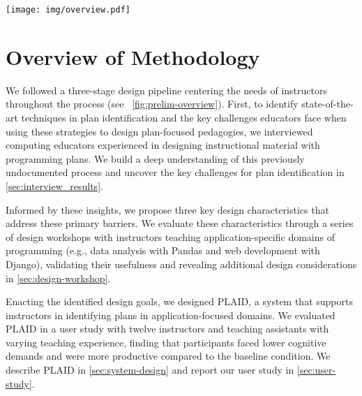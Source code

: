 \begin{figure*}[h]
    \centering
    \texttt{[image: img/overview.pdf]}
    \caption{An overview of the three-step process to motivate, develop, and evaluate PLAID.}
    \label{fig:prelim-overview}
\end{figure*}

\section{Overview of Methodology}


We followed a three-stage design pipeline centering the needs of instructors throughout the  process
(see ~\cref{fig:prelim-overview}). First, to identify state-of-the-art techniques in plan identification and the key challenges educators face when using these strategies to design plan-focused pedagogies, we interviewed computing educators experienced in designing instructional material with programming plans.
We build a deep understanding of this previously undocumented process and uncover the key challenges for plan identification in \cref{sec:interview_results}.

Informed by these insights, we propose three key design characteristics that address these primary barriers. We evaluate these characteristics through a series of design workshops with instructors teaching application-specific domains of programming (e.g., data analysis with Pandas and web development with Django), validating their usefulness and revealing additional design considerations in \cref{sec:design-workshop}.

Enacting the identified design goals, 
we designed PLAID, a system that supports instructors in identifying plans in application-focused domains. We evaluated PLAID in a user study with twelve instructors and teaching assistants with varying teaching experience, finding that participants faced lower cognitive demands and were more productive compared to the baseline condition. We describe PLAID in \cref{sec:system-design} and report our user study in \cref{sec:user-study}.